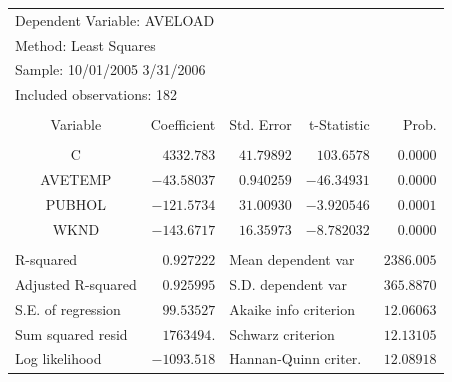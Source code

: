 \documentclass[12pt]{report}
\begin{document}
\begin{table}[H]
	\centering
	\begin{tabular}{lrrrr}
		\multicolumn{3}{l}{Dependent Variable: AVELOAD}&\multicolumn{1}{c}{}&\multicolumn{1}{c}{}\\
		\multicolumn{3}{l}{Method: Least Squares}&\multicolumn{1}{c}{}&\multicolumn{1}{c}{}\\
		\multicolumn{3}{l}{Sample: 10/01/2005 3/31/2006}&\multicolumn{1}{c}{}&\multicolumn{1}{c}{}\\
		\multicolumn{3}{l}{Included observations: 182}&\multicolumn{1}{c}{}&\multicolumn{1}{c}{}\\
		[4.5pt] \hline \\ [-4.5pt]
		\multicolumn{1}{c}{Variable}&\multicolumn{1}{r}{Coefficient}&\multicolumn{1}{r}{Std. Error}&\multicolumn{1}{r}{t-Statistic}&\multicolumn{1}{r}{Prob.}\\
		[4.5pt] \hline \\ [-4.5pt]
		\multicolumn{1}{c}{C}&\multicolumn{1}{r}{$4332.783$}&\multicolumn{1}{r}{$41.79892$}&\multicolumn{1}{r}{$103.6578$}&\multicolumn{1}{r}{$0.0000$}\\
		\multicolumn{1}{c}{AVETEMP}&\multicolumn{1}{r}{$-43.58037$}&\multicolumn{1}{r}{$0.940259$}&\multicolumn{1}{r}{$-46.34931$}&\multicolumn{1}{r}{$0.0000$}\\
		\multicolumn{1}{c}{PUBHOL}&\multicolumn{1}{r}{$-121.5734$}&\multicolumn{1}{r}{$31.00930$}&\multicolumn{1}{r}{$-3.920546$}&\multicolumn{1}{r}{$0.0001$}\\
		\multicolumn{1}{c}{WKND}&\multicolumn{1}{r}{$-143.6717$}&\multicolumn{1}{r}{$16.35973$}&\multicolumn{1}{r}{$-8.782032$}&\multicolumn{1}{r}{$0.0000$}\\
		[4.5pt] \hline \\ [-4.5pt]
		\multicolumn{1}{l}{R-squared}&\multicolumn{1}{r}{$0.927222$}&\multicolumn{2}{l}{Mean dependent var}&\multicolumn{1}{r}{$2386.005$}\\
		\multicolumn{1}{l}{Adjusted R-squared}&\multicolumn{1}{r}{$0.925995$}&\multicolumn{2}{l}{S.D. dependent var}&\multicolumn{1}{r}{$365.8870$}\\
		\multicolumn{1}{l}{S.E. of regression}&\multicolumn{1}{r}{$99.53527$}&\multicolumn{2}{l}{Akaike info criterion}&\multicolumn{1}{r}{$12.06063$}\\
		\multicolumn{1}{l}{Sum squared resid}&\multicolumn{1}{r}{$1763494.$}&\multicolumn{2}{l}{Schwarz criterion}&\multicolumn{1}{r}{$12.13105$}\\
		\multicolumn{1}{l}{Log likelihood}&\multicolumn{1}{r}{$-1093.518$}&\multicolumn{2}{l}{Hannan-Quinn criter.}&\multicolumn{1}{r}{$12.08918$}\\

\end{tabular}
\end{table}
\end{document}
